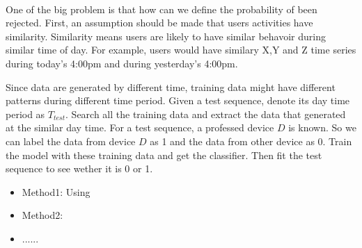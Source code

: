 \documentclass{article}
\begin{document}
	
	\paragraph{} One of the big problem is that how can we define the probability of been rejected. First, an assumption should be made that users activities have similarity. Similarity means users are likely to have similar behavoir during similar time of day. For example, users would have similary X,Y and Z time series during today's 4:00pm and during yesterday's 4:00pm.
	
	
	Since data are generated by different time, training data might have different patterns during different time period. Given a test sequence, denote its day time period as $T_{test}$. Search all the training data and extract the data that generated at the similar day time. For a test sequence, a professed device $D$ is known. So we can label the data from device $D$ as 1 and the data from other device as 0. Train the model with these training data and get the classifier. Then fit the test sequence to see wether it is 0 or 1. 
	\begin{itemize}
		\item Method1: Using 
		\item Method2:
		\item ......
	\end{itemize}
	
	
	
	
\end{document}
